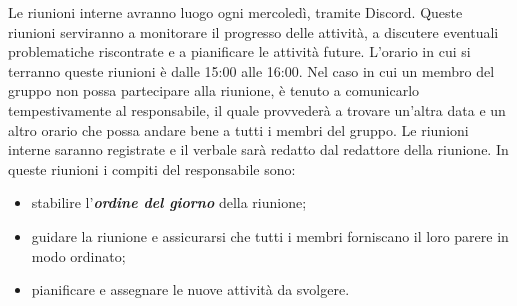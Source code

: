 Le riunioni interne avranno luogo ogni mercoledì, tramite Discord. Queste riunioni serviranno a monitorare il progresso delle attività, a discutere eventuali problematiche riscontrate e a pianificare le attività future. L'orario in cui si terranno queste riunioni è dalle 15:00 alle 16:00. Nel caso in cui un membro del gruppo non possa partecipare alla riunione, è tenuto a comunicarlo tempestivamente al responsabile, il quale provvederà a trovare un'altra data e un altro orario che possa andare bene a tutti i membri del gruppo. Le riunioni interne saranno registrate e il verbale sarà redatto dal redattore della riunione. In queste riunioni i compiti del responsabile sono:
\begin{itemize}
    \item stabilire l'\textbf{\textit{ordine del giorno}} della riunione;
    \item guidare la riunione e assicurarsi che tutti i membri forniscano il loro parere in modo ordinato;
    \item pianificare e assegnare le nuove attività da svolgere.
\end{itemize}

